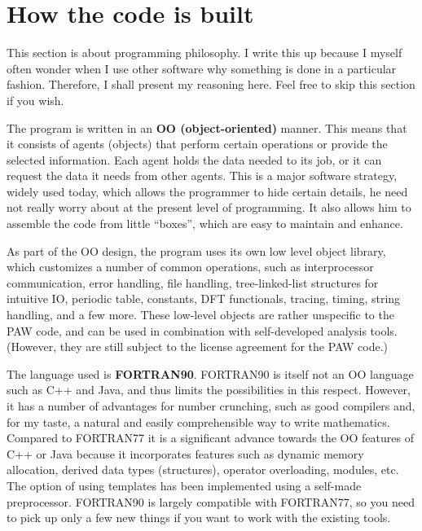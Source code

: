 \documentclass[final,12pt]{article}
\begin{document}
\section{How the code is built}

This section is about programming philosophy.  I write this up because
I myself often wonder when I use other software why something is done
in a particular fashion. Therefore, I shall present my reasoning here.
Feel free to skip this section if you wish.

The program is written in an {\bf OO (object-oriented)} manner. This
means that it consists of agents (objects) that perform certain
operations or provide the selected information. Each agent holds the
data needed to its job, or it can request the data it needs from other
agents. This is a major software strategy, widely used today, which
allows the programmer to hide certain details, he need not really worry about
at the present level of programming. It also allows him to assemble the
code from little ``boxes'', which are easy to maintain and enhance.

As part of the OO design, the program uses its own low level object
library, which customizes a number of common operations, such as
interprocessor communication, error handling, file handling,
tree-linked-list structures for intuitive IO, periodic table,
constants, DFT functionals, tracing, timing, string handling, and a
few more. These low-level objects are rather unspecific to the PAW
code, and can be used in combination with self-developed analysis
tools. (However, they are still subject to the license agreement for
the PAW code.)

The language used is {\bf FORTRAN90}. FORTRAN90 is itself not an OO
language such as C++ and Java, and thus limits the possibilities in
this respect. However, it has a number of advantages for number
crunching, such as good compilers and, for my taste, a natural and
easily comprehensible way to write mathematics. Compared to FORTRAN77
it is a significant advance towards the OO features of C++ or Java
because it incorporates features such as dynamic memory allocation,
derived data types (structures), operator overloading, modules, etc.
The option of using templates has been implemented using a self-made
preprocessor.  FORTRAN90 is largely compatible with FORTRAN77, so you
need to pick up only a few new things if you want to work with the
existing tools.
\end{document}
